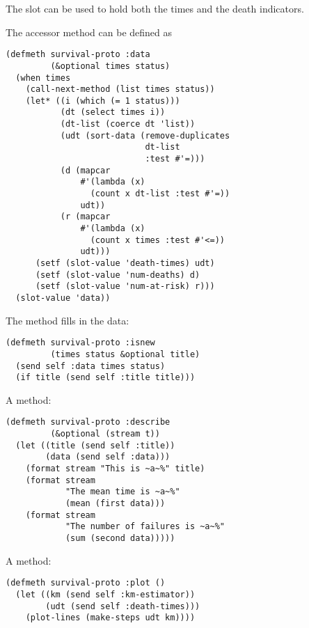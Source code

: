 \begin{slide}{}
The  slot can be used to hold both the times and the
death indicators.

The accessor method can be defined as
{\Large
\begin{verbatim}
(defmeth survival-proto :data
         (&optional times status)
  (when times
    (call-next-method (list times status))
    (let* ((i (which (= 1 status)))
           (dt (select times i))
           (dt-list (coerce dt 'list))
           (udt (sort-data (remove-duplicates
                            dt-list
                            :test #'=)))
           (d (mapcar
               #'(lambda (x)
                 (count x dt-list :test #'=))
               udt))
           (r (mapcar
               #'(lambda (x)
                 (count x times :test #'<=))
               udt)))
      (setf (slot-value 'death-times) udt)
      (setf (slot-value 'num-deaths) d)
      (setf (slot-value 'num-at-risk) r)))
  (slot-value 'data))
\end{verbatim}}
\end{slide}

\begin{slide}{}
The  method fills in the data:
{\Large
\begin{verbatim}
(defmeth survival-proto :isnew
         (times status &optional title)
  (send self :data times status)
  (if title (send self :title title)))
\end{verbatim}}
A  method:
{\Large
\begin{verbatim}
(defmeth survival-proto :describe
         (&optional (stream t))
  (let ((title (send self :title))
        (data (send self :data)))
    (format stream "This is ~a~%" title)
    (format stream
            "The mean time is ~a~%"
            (mean (first data)))
    (format stream
            "The number of failures is ~a~%"
            (sum (second data)))))
\end{verbatim}}
A  method:
{\Large
\begin{verbatim}
(defmeth survival-proto :plot ()
  (let ((km (send self :km-estimator))
        (udt (send self :death-times)))
    (plot-lines (make-steps udt km))))
\end{verbatim}}
\end{slide}

